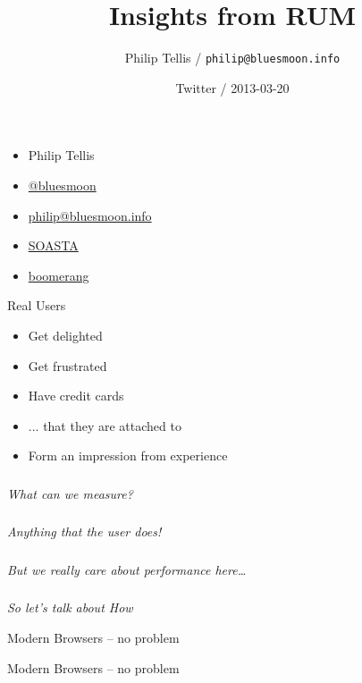 \documentclass{beamer}
\author{Philip Tellis / \texttt{philip@bluesmoon.info}}
\title{Insights from RUM}
\date{Twitter / 2013-03-20}
\newcommand{\innersplash}[1]{
  \begin{center}
    \Large \textrm{\textit{ #1 } }
  \end{center}
}
\newcommand{\splashslide}[2][{}]{
  \begin{frame}
  \frametitle{#1}
  \innersplash{#2}
  \end{frame}
}
\begin{document}
\begin{frame}
  \begin{itemize}
  \item Philip Tellis
  \item \href{http://twitter.com/bluesmoon}{@bluesmoon}
  \item \href{http://bluesmoon.info/}{philip@bluesmoon.info}
  \item \href{http://www.soasta.com/}{SOASTA}
  \item \href{http://lognormal.github.com/boomerang/doc/}{boomerang}
  \end{itemize}
\end{frame}

\begin{frame}
  \titlepage
\end{frame}

\begin{frame}{Real Users}
    \begin{block}{}
      \begin{itemize}
        \item Get delighted
        \item<2-> Get frustrated
        \item<3-> Have credit cards
        \item<4-> ... that they are attached to
        \item<5-> Form an impression from experience
      \end{itemize}
    \end{block}
\end{frame}

\splashslide{What can we measure?}

\splashslide{Anything that the user does! \\ \only<2->{(in the browser)}}

\splashslide{But we really care about performance here\ldots}

\splashslide{So let's talk about How}

\begin{frame}{Modern Browsers -- no problem}
\end{frame}

\begin{frame}{Modern Browsers -- no problem}
\end{frame}
\end{document}
